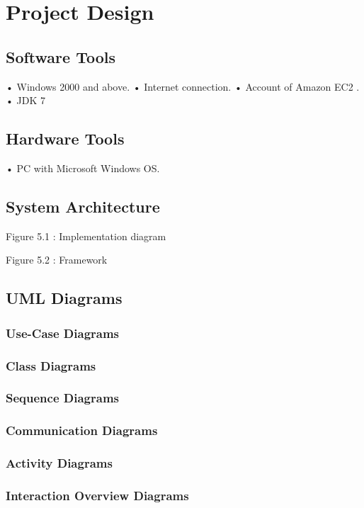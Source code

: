 \chapter{Project Design}

\section{Software Tools}


•  Windows 2000 and above. 
•	 Internet connection.
•	Account of Amazon EC2 .
•	JDK 7

\section{Hardware Tools}

•  PC with Microsoft Windows OS.

\section{System Architecture}

 
Figure 5.1 : Implementation diagram



 
Figure 5.2 : Framework 

\section{UML Diagrams}
\subsection{Use-Case Diagrams}
\subsection{Class Diagrams}
\subsection{Sequence Diagrams}

\subsection{Communication Diagrams}

\subsection{Activity Diagrams}
\subsection{Interaction Overview Diagrams}

